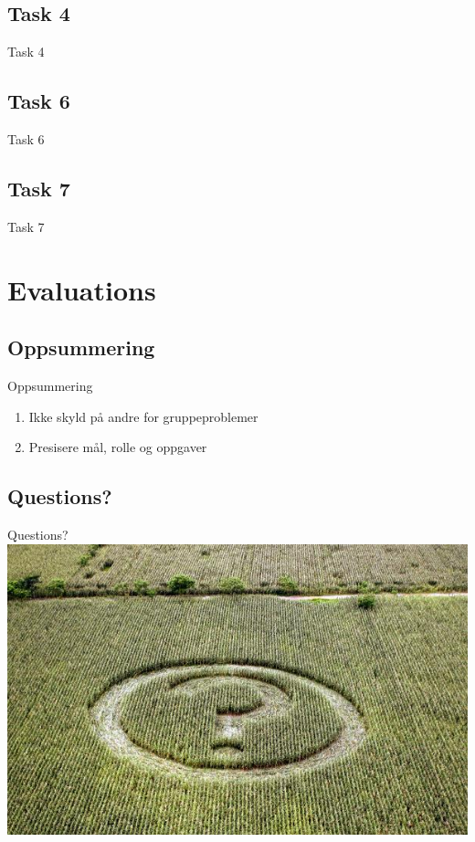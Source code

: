 \documentclass[screen, compress]{beamer}
\begin{document}
\subsection{Task 4}
\begin{frame}{Task 4}
\end{frame}


\subsection{Task 6}
\begin{frame}{Task 6}
\end{frame}


\subsection{Task 7}
\begin{frame}{Task 7}
\end{frame}


\section{Evaluations}

\subsection{Oppsummering}
\begin{frame}{Oppsummering}
\begin{enumerate}
	\item Ikke skyld på andre for gruppeproblemer
	\item Presisere mål, rolle og oppgaver
\end{enumerate}
\end{frame}


\subsection{Questions?}
\begin{frame}{Questions?}
\includegraphics[width=\textwidth]{img/any-questions}
\end{frame}
\end{document}
